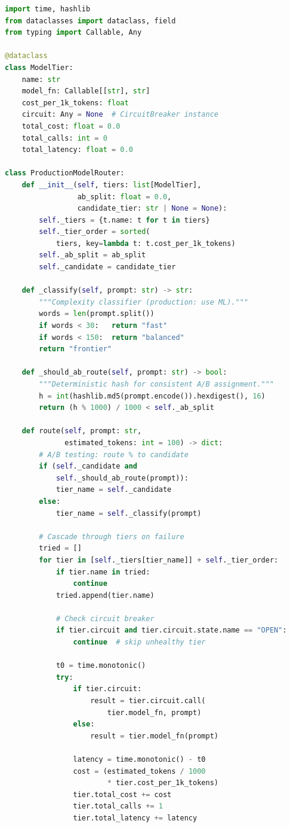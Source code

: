 \begin{lstlisting}[language=Python]
import time, hashlib
from dataclasses import dataclass, field
from typing import Callable, Any

@dataclass
class ModelTier:
    name: str
    model_fn: Callable[[str], str]
    cost_per_1k_tokens: float
    circuit: Any = None  # CircuitBreaker instance
    total_cost: float = 0.0
    total_calls: int = 0
    total_latency: float = 0.0

class ProductionModelRouter:
    def __init__(self, tiers: list[ModelTier],
                 ab_split: float = 0.0,
                 candidate_tier: str | None = None):
        self._tiers = {t.name: t for t in tiers}
        self._tier_order = sorted(
            tiers, key=lambda t: t.cost_per_1k_tokens)
        self._ab_split = ab_split
        self._candidate = candidate_tier

    def _classify(self, prompt: str) -> str:
        """Complexity classifier (production: use ML)."""
        words = len(prompt.split())
        if words < 30:   return "fast"
        if words < 150:  return "balanced"
        return "frontier"

    def _should_ab_route(self, prompt: str) -> bool:
        """Deterministic hash for consistent A/B assignment."""
        h = int(hashlib.md5(prompt.encode()).hexdigest(), 16)
        return (h % 1000) / 1000 < self._ab_split

    def route(self, prompt: str,
              estimated_tokens: int = 100) -> dict:
        # A/B testing: route % to candidate
        if (self._candidate and
            self._should_ab_route(prompt)):
            tier_name = self._candidate
        else:
            tier_name = self._classify(prompt)

        # Cascade through tiers on failure
        tried = []
        for tier in [self._tiers[tier_name]] + self._tier_order:
            if tier.name in tried:
                continue
            tried.append(tier.name)

            # Check circuit breaker
            if tier.circuit and tier.circuit.state.name == "OPEN":
                continue  # skip unhealthy tier

            t0 = time.monotonic()
            try:
                if tier.circuit:
                    result = tier.circuit.call(
                        tier.model_fn, prompt)
                else:
                    result = tier.model_fn(prompt)

                latency = time.monotonic() - t0
                cost = (estimated_tokens / 1000
                        * tier.cost_per_1k_tokens)
                tier.total_cost += cost
                tier.total_calls += 1
                tier.total_latency += latency


\end{lstlisting}
